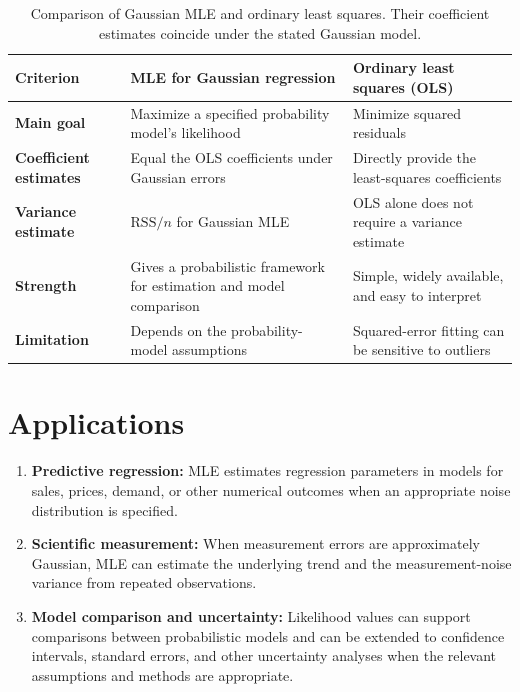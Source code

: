 \documentclass[11pt,a4paper]{article}
\begin{document}
\begin{table}[H]
\centering
\small
\begin{tabularx}{\textwidth}{>{\bfseries}p{2.4cm} X X}
\toprule
Criterion & MLE for Gaussian regression & Ordinary least squares (OLS)\\
\midrule
Main goal & Maximize a specified probability model's likelihood & Minimize squared residuals\\
Coefficient estimates & Equal the OLS coefficients under Gaussian errors & Directly provide the least-squares coefficients\\
Variance estimate & $\mathrm{RSS}/n$ for Gaussian MLE & OLS alone does not require a variance estimate\\
Strength & Gives a probabilistic framework for estimation and model comparison & Simple, widely available, and easy to interpret\\
Limitation & Depends on the probability-model assumptions & Squared-error fitting can be sensitive to outliers\\
\bottomrule
\end{tabularx}
\caption{Comparison of Gaussian MLE and ordinary least squares. Their coefficient estimates coincide under the stated Gaussian model.}
\label{tab:comparison}
\end{table}

\section{Applications}
\begin{enumerate}
\item \textbf{Predictive regression:} MLE estimates regression parameters in models for sales, prices, demand, or other numerical outcomes when an appropriate noise distribution is specified.
\item \textbf{Scientific measurement:} When measurement errors are approximately Gaussian, MLE can estimate the underlying trend and the measurement-noise variance from repeated observations.
\item \textbf{Model comparison and uncertainty:} Likelihood values can support comparisons between probabilistic models and can be extended to confidence intervals, standard errors, and other uncertainty analyses when the relevant assumptions and methods are appropriate.
\end{enumerate}
\end{document}
